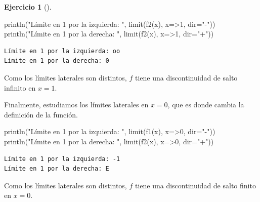 \documentclass[
  a4paper,
]{scrreport}
\newenvironment{Shaded}{\begin{snugshade}}{\end{snugshade}}
\newcommand{\FloatTok}[1]{\textcolor[rgb]{0.68,0.00,0.00}{#1}}
\newcommand{\FunctionTok}[1]{\textcolor[rgb]{0.28,0.35,0.67}{#1}}
\newcommand{\NormalTok}[1]{\textcolor[rgb]{0.00,0.23,0.31}{#1}}
\newcommand{\OperatorTok}[1]{\textcolor[rgb]{0.37,0.37,0.37}{#1}}
\newcommand{\StringTok}[1]{\textcolor[rgb]{0.13,0.47,0.30}{#1}}
\theoremstyle{definition}
\newtheorem{exercise}{Ejercicio}[chapter]
\theoremstyle{remark}
\begin{document}
\begin{exercise}[]
\begin{tcolorbox}
\begin{Shaded}
\begin{Highlighting}[]
\FunctionTok{println}\NormalTok{(}\StringTok{"Límite en 1 por la izquierda: "}\NormalTok{, }\FunctionTok{limit}\NormalTok{(}\FunctionTok{f2}\NormalTok{(x), x}\OperatorTok{=\textgreater{}}\FloatTok{1}\NormalTok{, dir}\OperatorTok{=}\StringTok{"{-}"}\NormalTok{))}
\FunctionTok{println}\NormalTok{(}\StringTok{"Límite en 1 por la derecha: "}\NormalTok{, }\FunctionTok{limit}\NormalTok{(}\FunctionTok{f2}\NormalTok{(x), x}\OperatorTok{=\textgreater{}}\FloatTok{1}\NormalTok{, dir}\OperatorTok{=}\StringTok{"+"}\NormalTok{))}
\end{Highlighting}
\end{Shaded}

\begin{verbatim}
Límite en 1 por la izquierda: oo
Límite en 1 por la derecha: 0
\end{verbatim}

Como los límites laterales son distintos, \(f\) tiene una discontinuidad
de salto infinito en \(x=1\).

Finalmente, estudiamos los límites laterales en \(x=0\), que es donde
cambia la definición de la función.

\begin{Shaded}
\begin{Highlighting}[]
\FunctionTok{println}\NormalTok{(}\StringTok{"Límite en 1 por la izquierda: "}\NormalTok{, }\FunctionTok{limit}\NormalTok{(}\FunctionTok{f1}\NormalTok{(x), x}\OperatorTok{=\textgreater{}}\FloatTok{0}\NormalTok{, dir}\OperatorTok{=}\StringTok{"{-}"}\NormalTok{))}
\FunctionTok{println}\NormalTok{(}\StringTok{"Límite en 1 por la derecha: "}\NormalTok{, }\FunctionTok{limit}\NormalTok{(}\FunctionTok{f2}\NormalTok{(x), x}\OperatorTok{=\textgreater{}}\FloatTok{0}\NormalTok{, dir}\OperatorTok{=}\StringTok{"+"}\NormalTok{))}
\end{Highlighting}
\end{Shaded}

\begin{verbatim}
Límite en 1 por la izquierda: -1
Límite en 1 por la derecha: E
\end{verbatim}

Como los límites laterales son distintos, \(f\) tiene una discontinuidad
de salto finito en \(x=0\).

\end{tcolorbox}

\end{exercise}
\end{document}
